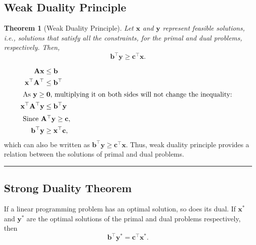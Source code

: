 \documentclass[twoside]{article}
\newcounter{lecnum}
\newtheorem{theorem}{Theorem}[lecnum]
\newenvironment{proof}{{\textit{Proof.}}}{\hfill\rule{2mm}{2mm}}
\begin{document}
\subsection{Weak Duality Principle}

\begin{theorem}[Weak Duality Principle]
    Let $\mathbf{x}$ and $\mathbf{y}$ represent feasible solutions, i.e., solutions
    that satisfy all the constraints, for the primal and dual problems,
    respectively. Then, \[
        \mathbf{b}^\top \mathbf{y} \ge \mathbf{c}^\top \mathbf{x}.
    \] 
\end{theorem}
\begin{proof}
    \begin{align}
        \mathbf{Ax} &\leq \mathbf{b} \\
        \mathbf{x}^\top \mathbf{A}^\top &\leq \mathbf{b}^\top \\
        \intertext{
            As $\mathbf{y} \geq \mathbf{0}$, multiplying it on both sides will not
            change the inequality:
        }
        \mathbf{x}^\top \mathbf{A}^\top \mathbf{y}
                                        &\leq \mathbf{b}^\top \mathbf{y} \\
        \intertext{
            Since $\mathbf{A}^\top \mathbf{y} \geq \mathbf{c},$
        }
        \mathbf{b}^\top \mathbf{y} &\geq \mathbf{x}^\top \mathbf{c},
    \end{align}
    which can also be written as $\mathbf{b}^\top \mathbf{y} \geq
    \mathbf{c}^\top \mathbf{x}$.
    Thus, weak duality principle provides a relation between the
    solutions of primal and dual problems.
\end{proof}

\subsection{Strong Duality Theorem}
If a linear programming problem has an optimal solution, so does its dual. If
$\mathbf{x^*}$ and $\mathbf{y^*}$ are the optimal solutions of the primal and
dual problems respectively, then \[
    \mathbf{b}^\top \mathbf{y}^* = \mathbf{c}^\top \mathbf{x}^*.
\]
\end{document}
